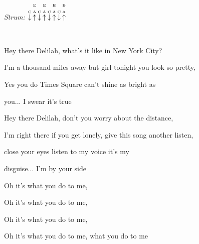 \begin{song}


\begin{headerbox}
\textit{Strum:} $\PluckDown{C}\PluckUp{E \\ A}\PluckDown{C}\PluckUp{E \\ A}\PluckDown{C}\PluckUp{E \\ A}\PluckDown{C}\PluckUp{E \\ A}$
\end{headerbox}

\begin{chordbox}
\par
{}\par
{}\par
{}\par
{}\par
\end{chordbox}

\bigskip

\Intro\     \par

\bigskip

 Hey there Delilah, what's it like in New York City? \par
I'm a thousand miles away but girl tonight you look so pretty, \par
Yes you do  Times Square can't shine as bright as \par
{}you... I swear it's true \par

\bigskip

 Hey there Delilah, don't you worry about the distance, \par
I'm right there if you get lonely, give this song another listen, \par
close your eyes listen to my voice it's my \par
disguise... I'm by your side \par

\bigskip

\begin{chorusbox}{\Chorus}
Oh it's what you do to me, \par
{}Oh it's what you do to me, \par
{}Oh it's what you do to me, \par
{}Oh it's what you do to me, what you  do to me \par
\end{chorusbox}


\end{song}
